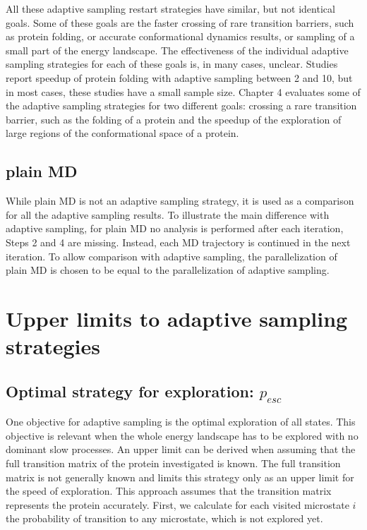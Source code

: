 All these adaptive sampling restart strategies have similar, but not identical goals.
Some of these goals are the faster crossing of rare transition barriers, such as protein folding, or accurate conformational dynamics results, or sampling of a small part of the energy landscape.
The effectiveness of the individual adaptive sampling strategies for each of these goals is, in many cases, unclear. Studies \cite{preto2014fast,weber2011characterization,bowman2010enhanced,Fabritiis-2014} report speedup of protein folding with adaptive sampling between 2 and 10, but in most cases, these studies have a small sample size. Chapter 4 evaluates some of the adaptive sampling strategies for two different goals: crossing a rare transition barrier, such as the folding of a protein and the speedup of the exploration of large regions of the conformational space of a protein.

\subsection{plain MD} 

While plain MD is not an adaptive sampling strategy, it is used as a comparison for all the adaptive sampling results. To illustrate the main difference with adaptive sampling, for plain MD no analysis is performed after each iteration, Steps 2 and 4 are missing. Instead, each MD trajectory is continued in the next iteration. To allow comparison with adaptive sampling, the parallelization of plain MD is chosen to be equal to the parallelization of adaptive sampling.  

\section{Upper limits to adaptive sampling strategies}

\subsection{Optimal strategy for exploration: $p_{esc}$}

One objective for adaptive sampling is the optimal exploration of all states. This objective is relevant when the whole energy landscape has to be explored with no dominant slow processes. 
An upper limit can be derived when assuming that the full transition matrix of the protein investigated is known. The full transition matrix is not generally known and limits this strategy only as an upper limit for the speed of exploration. This approach assumes that the transition matrix represents the protein accurately.
First, we calculate for each visited microstate $i$ the probability of transition to any microstate, which is not explored yet.

